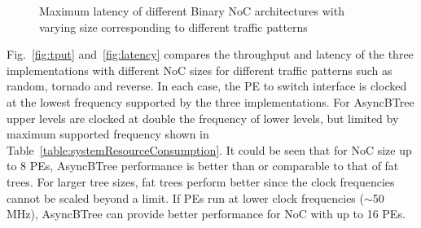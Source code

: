 \begin{figure}[t]
\centering     %
{}
\vspace{-3mm}
\caption{Maximum latency of different Binary NoC architectures with varying size corresponding to different traffic patterns}
\vspace{-5mm}
\label{fig:latmax}
\end{figure}

Fig.~\ref{fig:tput} and~\ref{fig:latency} compares the throughput and latency of the three implementations with different NoC sizes for different traffic patterns such as random, tornado and reverse.
In each case, the PE to switch interface is clocked at the lowest frequency supported by the three implementations.
For AsyncBTree upper levels are clocked at double the frequency of lower levels, but limited by maximum supported frequency shown in Table~\ref{table:systemResourceConsumption}.
It could be seen that for NoC size up to 8 PEs, AsyncBTree performance is better than or comparable to that of fat trees.
For larger tree sizes, fat trees perform better since the clock frequencies cannot be scaled beyond a limit.
If PEs run at lower clock frequencies ($\sim$50 MHz), AsyncBTree can provide better performance for NoC with up to 16 PEs. 


